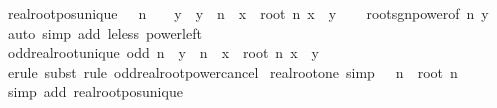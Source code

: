 \begin{isabellebody}
\endisatagproof
{\isafoldproof}%
%
\isadelimproof
\isanewline
%
\endisadelimproof
\isanewline
{}\isamarkupfalse%
\ real{\isacharunderscore}{\kern0pt}root{\isacharunderscore}{\kern0pt}pos{\isacharunderscore}{\kern0pt}unique{\isacharcolon}{\kern0pt}\ {\isachardoublequoteopen}{}\ {\isacharless}{\kern0pt}\ n\ {\isasymLongrightarrow}\ {}\ {\isasymle}\ y\ {\isasymLongrightarrow}\ y\ {\isacharcircum}{\kern0pt}\ n\ {\isacharequal}{\kern0pt}\ x\ {\isasymLongrightarrow}\ root\ n\ x\ {\isacharequal}{\kern0pt}\ y{\isachardoublequoteclose}\isanewline
%
\isadelimproof
\ \ %
\endisadelimproof
%
\isatagproof
{}\isamarkupfalse%
\ root{\isacharunderscore}{\kern0pt}sgn{\isacharunderscore}{\kern0pt}power{\isacharbrackleft}{\kern0pt}of\ n\ y{\isacharbrackright}{\kern0pt}\ \isamarkupfalse%
\ {\isacharparenleft}{\kern0pt}auto\ simp\ add{\isacharcolon}{\kern0pt}\ le{\isacharunderscore}{\kern0pt}less\ power{\isacharunderscore}{\kern0pt}{}{\isacharunderscore}{\kern0pt}left{\isacharparenright}{\kern0pt}%
\endisatagproof
{\isafoldproof}%
%
\isadelimproof
\isanewline
%
\endisadelimproof
\isanewline
{}\isamarkupfalse%
\ odd{\isacharunderscore}{\kern0pt}real{\isacharunderscore}{\kern0pt}root{\isacharunderscore}{\kern0pt}unique{\isacharcolon}{\kern0pt}\ {\isachardoublequoteopen}odd\ n\ {\isasymLongrightarrow}\ y\ {\isacharcircum}{\kern0pt}\ n\ {\isacharequal}{\kern0pt}\ x\ {\isasymLongrightarrow}\ root\ n\ x\ {\isacharequal}{\kern0pt}\ y{\isachardoublequoteclose}\isanewline
%
\isadelimproof
\ \ %
\endisadelimproof
%
\isatagproof
{}\isamarkupfalse%
\ {\isacharparenleft}{\kern0pt}erule\ subst{\isacharcomma}{\kern0pt}\ rule\ odd{\isacharunderscore}{\kern0pt}real{\isacharunderscore}{\kern0pt}root{\isacharunderscore}{\kern0pt}power{\isacharunderscore}{\kern0pt}cancel{\isacharparenright}{\kern0pt}%
\endisatagproof
{\isafoldproof}%
%
\isadelimproof
\isanewline
%
\endisadelimproof
\isanewline
{}\isamarkupfalse%
\ real{\isacharunderscore}{\kern0pt}root{\isacharunderscore}{\kern0pt}one\ {\isacharbrackleft}{\kern0pt}simp{\isacharbrackright}{\kern0pt}{\isacharcolon}{\kern0pt}\ {\isachardoublequoteopen}{}\ {\isacharless}{\kern0pt}\ n\ {\isasymLongrightarrow}\ root\ n\ {}\ {\isacharequal}{\kern0pt}\ {}{\isachardoublequoteclose}\isanewline
%
\isadelimproof
\ \ %
\endisadelimproof
%
\isatagproof
{}\isamarkupfalse%
\ {\isacharparenleft}{\kern0pt}simp\ add{\isacharcolon}{\kern0pt}\ real{\isacharunderscore}{\kern0pt}root{\isacharunderscore}{\kern0pt}pos{\isacharunderscore}{\kern0pt}unique{\isacharparenright}{\kern0pt}%

\end{isabellebody}
